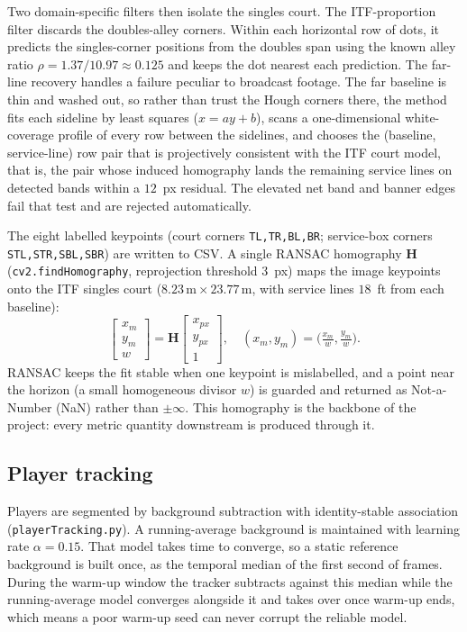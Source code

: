 \documentclass[11pt]{article}
\begin{document}
Two domain-specific filters then isolate the singles court. The ITF-proportion filter discards the doubles-alley corners. Within each horizontal row of dots, it predicts the singles-corner positions from the doubles span using the known alley ratio $\rho = 1.37/10.97 \approx 0.125$ and keeps the dot nearest each prediction. The far-line recovery handles a failure peculiar to broadcast footage. The far baseline is thin and washed out, so rather than trust the Hough corners there, the method fits each sideline by least squares ($x = ay + b$), scans a one-dimensional white-coverage profile of every row between the sidelines, and chooses the (baseline, service-line) row pair that is projectively consistent with the ITF court model, that is, the pair whose induced homography lands the remaining service lines on detected bands within a $12$~px residual. The elevated net band and banner edges fail that test and are rejected automatically.

The eight labelled keypoints (court corners \texttt{TL,TR,BL,BR}; service-box corners \texttt{STL,STR,SBL,SBR}) are written to CSV. A single RANSAC homography $\mathbf{H}$ (\texttt{cv2.findHomography}, reprojection threshold $3$~px) maps the image keypoints onto the ITF singles court ($8.23\,\text{m}\times 23.77\,\text{m}$, with service lines $18$~ft from each baseline):
\begin{equation}
\begin{bmatrix} x_m \\ y_m \\ w \end{bmatrix} = \mathbf{H}\begin{bmatrix} x_{px} \\ y_{px} \\ 1 \end{bmatrix},
\quad (x_m, y_m) = \Big(\tfrac{x_m}{w}, \tfrac{y_m}{w}\Big).
\end{equation}
RANSAC keeps the fit stable when one keypoint is mislabelled, and a point near the horizon (a small homogeneous divisor $w$) is guarded and returned as Not-a-Number (NaN) rather than $\pm\infty$. This homography is the backbone of the project: every metric quantity downstream is produced through it.

\subsection{Player tracking}
Players are segmented by background subtraction with identity-stable association (\texttt{playerTracking.py}). A running-average background is maintained with learning rate $\alpha = 0.15$. That model takes time to converge, so a static reference background is built once, as the temporal median of the first second of frames. During the warm-up window the tracker subtracts against this median while the running-average model converges alongside it and takes over once warm-up ends, which means a poor warm-up seed can never corrupt the reliable model.
\end{document}
